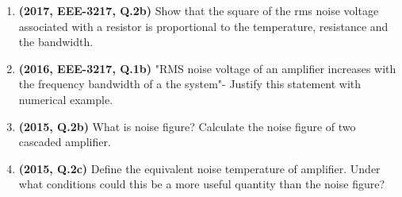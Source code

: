 \documentclass[12pt, a4paper]{article}
\begin{document}
\begin{enumerate}
		\item \textbf{(2017, EEE-3217, Q.2b)} Show that the square of the rms noise voltage associated with a resistor is proportional to the temperature, resistance and the bandwidth.
		\item \textbf{(2016, EEE-3217, Q.1b)} "RMS noise voltage of an amplifier increases with the frequency bandwidth of a the system"- Justify this statement with numerical example.
		
		\item \textbf{(2015, Q.2b)} What is noise figure? Calculate the noise figure of two cascaded amplifier.
		
		\item \textbf{(2015, Q.2c)} Define the equivalent noise temperature of amplifier. Under what conditions could this be a more useful quantity than the noise figure?
		
	\end{enumerate}
	
\end{document}

